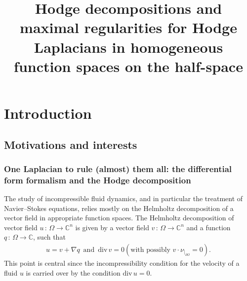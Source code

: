 \documentclass[AHL,Unicode,longabstracts,published]{cedram}
\title[Hodge decompositions and maximal regularity for Hodge Laplacians on the half-space]{Hodge decompositions and maximal regularities for Hodge Laplacians in homogeneous function spaces on the half-space}
\author[\initial{A.} \lastname{Gaudin}]{\firstname{Anatole} \lastname{Gaudin}}
\renewcommand*{\div}{\mathrm{div\,}}
\newcommand{\bbC}{\mathbb{C}}
\begin{document}
\maketitle
\setcounter{tocdepth}{3}
\tableofcontents

\section{Introduction}


\subsection{Motivations and interests}

\subsubsection{One Laplacian to rule (almost) them all: the differential form formalism and the Hodge decomposition}

The study of incompressible fluid dynamics, and in particular the treatment of Navier--Stokes equations, relies mostly on the Helmholtz decomposition of a vector field in appropriate function spaces. The Helmholtz decomposition of vector field $u\,:\,\Omega \longrightarrow \bbC^n$ is given by a vector field $v\,:\,\Omega \longrightarrow \bbC^n$ and a function $q\,:\,\Omega \longrightarrow \bbC$, such that
\begin{align*}
u = v+\nabla q \,\text{ and }\, \div v = 0  \left(\text{with possibly } v\cdot\nu_{|_{\partial\Omega}} = 0 \right).
\end{align*}
This point is central since the incompressibility condition for the velocity of a fluid $u$ is carried over by the condition $\div u=0$.
\end{document}
